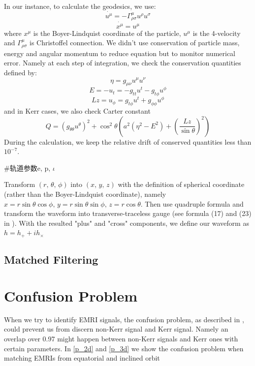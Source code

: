 \documentclass{article}
\begin{document}
In our instance, to calculate the geodesics, we use:
\begin{equation}
	\dot{u^\mu}=-\Gamma^\mu_{\rho\sigma}u^\rho u^\sigma
\end{equation}
\begin{equation}
	\dot{x^\mu}=u^\mu 
\end{equation}
where $x^\mu$ is the Boyer-Lindquist coordinate of the particle, $u^\mu$ is the 4-velocity and $\Gamma^\mu_{\rho\sigma}$ is Christoffel connection. We didn't use conservation of particle mass, energy and angular momentum to reduce equation but to monitor numerical error. Namely at each step of integration, we check the conservation quantities defined by:
\begin{equation}
	\eta = g_{\mu\nu} u^\mu u^\nu
\end{equation}
\begin{equation}
	E = -u_t = - g_{tt} u^t -g_{t\phi} u^\phi
\end{equation}
\begin{equation}
	Lz = u_\phi = g_{t\phi } u^t + g_{\phi\phi} u^\phi
\end{equation}
 and in Kerr cases, we also check Carter constant
 \begin{equation}
 	Q = (g_{\theta\theta} u^\theta)^2 + \cos ^2 \theta (a^2 (\eta^2-E^2) + (\frac{Lz}{\sin \theta})^2 )
 \end{equation}
During the calculation, we keep the relative drift of conserved quantities less than $10^{-7}$.

#轨道参数e, p, $\iota$

Transform $(r,\,\theta,\,\phi)$ into $(x,\,y,\,z)$ with the definition of spherical coordinate (rather than the Boyer-Lindquist coordinate), namely $x=r\sin\theta \cos \phi,\, y=r\sin\theta\sin\phi,\, z=r\cos\theta$. Then use quadruple formula and transform the waveform into transverse-traceless gauge (see formula (17) and (23) in \cite{kludge}). With the resulted "plus" and "cross" components, we define our waveform as $h = h_+ + i h_\times$
\subsection{Matched Filtering}
\label{p_mf}
\section{Confusion Problem}
When we try to identify EMRI signals, the confusion problem, as described in \cite{sameOmg}, could prevent us from discern non-Kerr signal and Kerr signal. Namely an overlap over 0.97 might happen between non-Kerr signals and Kerr ones with certain parameters. In \ref{p_2d} and \ref{p_3d} we show the confusion problem when matching EMRIs from equatorial and inclined orbit 
\end{document}
